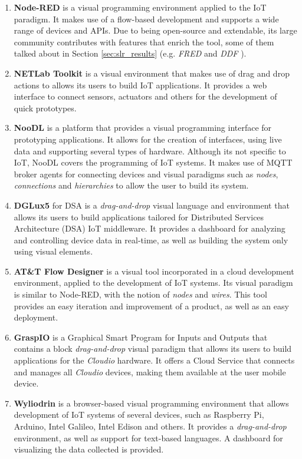 \begin{enumerate}
    \item \textbf{Node-RED} \cite{node_red} is a visual programming environment applied to the IoT paradigm. It makes use of a flow-based development and supports a wide range of devices and APIs. Due to being open-source and extendable, its large community contributes with features that enrich the tool, some of them talked about in Section \ref{sec:slr_results} (e.g. \textit{FRED} \cite{fred} and \textit{DDF} \cite{ddf}).
    \item \textbf{NETLab Toolkit} \cite{netlabtoolkit} is a visual environment that makes use of drag and drop actions to allows its users to build IoT applications. It provides a web interface to connect sensors, actuators and others for the development of quick prototypes.
    \item \textbf{NooDL} \cite{noodl} is a platform that provides a visual programming interface for prototyping applications. It allows for the creation of interfaces, using live data and supporting several types of hardware. Although its not specific to IoT, NooDL covers the programming of IoT systems. It makes use of MQTT broker agents for connecting devices and visual paradigms such as \textit{nodes}, \textit{connections} and \textit{hierarchies} to allow the user to build its system.
    \item \textbf{DGLux5} \cite{dglux5} for DSA is a \textit{drag-and-drop} visual language and environment that allows its users to build applications tailored for Distributed Services Architecture (DSA) IoT middleware. It provides a dashboard for analyzing and controlling device data in real-time, as well as building the system only using visual elements.
    \item \textbf{AT\&T Flow Designer} \cite{attflowdesigner} is a visual tool incorporated in a cloud development environment, applied to the development of IoT systems. Its visual paradigm is similar to Node-RED, with the notion of \textit{nodes} and \textit{wires}. This tool provides an easy iteration and improvement of a product, as well as an easy deployment.
    \item \textbf{GraspIO} \cite{graspio} is a Graphical Smart Program for Inputs and Outputs that contains a block \textit{drag-and-drop} visual paradigm that allows its users to build applications for the \textit{Cloudio} hardware. It offers a Cloud Service that connects and manages all \textit{Cloudio} devices, making them available at the user mobile device.
    \item \textbf{Wyliodrin} \cite{wyliodrin} is a browser-based visual programming environment that allows development of IoT systems of several devices, such as Raspberry Pi, Arduino, Intel Galileo, Intel Edison and others. It provides a \textit{drag-and-drop} environment, as well as support for text-based languages. A dashboard for visualizing the data collected is provided.

\end{enumerate}
